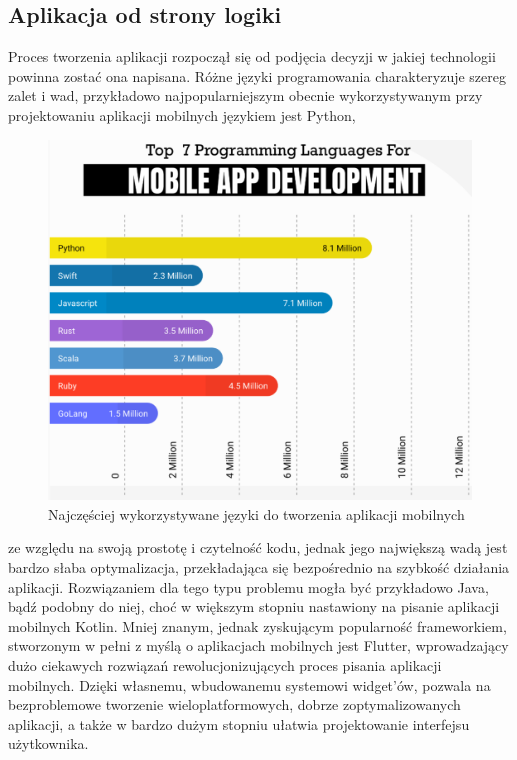 \documentclass[12pt, a4paper]{article}
\begin{document}
\begin{sloppypar}
{  \subsection{Aplikacja od strony logiki}{
  Proces tworzenia aplikacji rozpoczął się od podjęcia decyzji w jakiej technologii powinna
  zostać ona napisana. Różne języki programowania charakteryzuje szereg zalet i wad, przykładowo
  najpopularniejszym obecnie wykorzystywanym przy projektowaniu aplikacji mobilnych
  językiem jest Python,
  \begin{figure}[H]
    \centering
    \includegraphics[width=.9\textwidth]{top-lang-info.PNG}
    \caption{Najczęściej wykorzystywane języki do tworzenia aplikacji mobilnych}
    \label{fig:lang}
  \end{figure} 
  ze względu na swoją prostotę i czytelność kodu, jednak jego największą wadą jest bardzo
  słaba optymalizacja, przekładająca się bezpośrednio na szybkość działania aplikacji.
  Rozwiązaniem dla tego typu problemu mogła być przykładowo Java, bądź podobny do niej,
  choć w większym stopniu nastawiony na pisanie aplikacji mobilnych Kotlin. Mniej znanym,
  jednak zyskującym popularność frameworkiem, stworzonym w pełni z myślą o aplikacjach mobilnych
  jest Flutter, wprowadzający dużo ciekawych rozwiązań rewolucjonizujących proces pisania
  aplikacji mobilnych. Dzięki własnemu, wbudowanemu systemowi widget'ów, pozwala na
  bezproblemowe tworzenie wieloplatformowych, dobrze zoptymalizowanych aplikacji, a także
  w bardzo dużym stopniu ułatwia projektowanie interfejsu użytkownika.

}}
\end{sloppypar}
\end{document}
